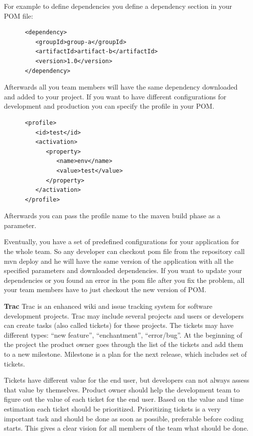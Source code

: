 \documentclass{article}
\begin{document}
  For example to define dependencies you define a dependency section in your POM file:
  \lstset{language=XML}
    \begin{lstlisting}
      <dependency>
         <groupId>group-a</groupId>
         <artifactId>artifact-b</artifactId>
         <version>1.0</version>
      </dependency>
    \end{lstlisting}  

  Afterwards all you team members will have the same dependency downloaded and
  added to your project. If you want to have different configurations for
  development and production you can specify the profile in your POM.
   \lstset{language=XML}
    \begin{lstlisting}
      <profile>
         <id>test</id>
         <activation>
            <property>
               <name>env</name>
               <value>test</value>
            </property>
         </activation>
      </profile>
    \end{lstlisting}
  Afterwards you can pass the profile name to the maven build phase as
  a parameter.

  Eventually, you have a set of predefined configurations for your application
  for the whole team. So any developer can checkout pom file from the repository
  call mvn deploy and he will have the same version of the application with all
  the specified parameters and downloaded dependencies. If you want to update
  your dependencies or you found an error in the pom file after you fix the
  problem, all your team members have to just checkout the new version of POM.
 
  \textbf{Trac}
  Trac is an enhanced wiki and issue tracking system for software development
  projects. Trac may include several projects and users or developers can
  create tasks (also called tickets) for these projects. The tickets may have different types:
  “new feature”, “enchantment”, “error/bug”. At the beginning of the project the product owner
  goes through the list of the tickets and add them to a new milestone.
  Milestone is a plan for the next release, which includes set of tickets.

  Tickets have different value for the end user, but developers can not always
  assess that value by themselves. Product owner should help the development team to figure out the
  value of each ticket for the end user. Based on the value and time estimation each ticket should be prioritized.
  Prioritizing tickets is a very important task and should be done as soon as
  possible, preferable before coding starts. This gives a clear vision for all
  members of the team what should be done.
\end{document}
